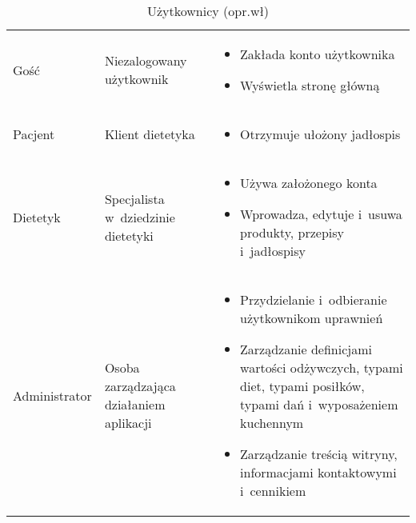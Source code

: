 \begin{minipage}{\textwidth}
    \begin{table}[H]
        \centering\caption{Użytkownicy (opr.wł)\label{tabela:uzytkownicy}}
        \begin{tabular}{|P{.15\textwidth}|P{.25\textwidth}|P{.5\textwidth}|}

            \hline
             &  & \\

            \hline
            Gość &
            Niezalogowany użytkownik &
            \begin{itemize}
                \item Zakłada konto użytkownika
                \item Wyświetla stronę główną
            \end{itemize} \\
            \hline
            Pacjent &
            Klient dietetyka &
            \begin{itemize}
                \item Otrzymuje ułożony jadłospis
            \end{itemize} \\
            \hline
            Dietetyk &
            Specjalista w~dziedzinie dietetyki &
            \begin{itemize}
                \item Używa założonego konta
                \item Wprowadza, edytuje i~usuwa produkty, przepisy i~jadłospisy
            \end{itemize} \\
            \hline
            Administrator &
            Osoba zarządzająca działaniem aplikacji &
            \begin{itemize}
                \item Przydzielanie i~odbieranie użytkownikom uprawnień
                \item Zarządzanie definicjami wartości odżywczych, typami diet, typami posiłków, typami dań i~wyposażeniem kuchennym
                \item Zarządzanie treścią witryny, informacjami kontaktowymi i~cennikiem
            \end{itemize} \\
            \hline
        \end{tabular}
    \end{table}
\end{minipage}

